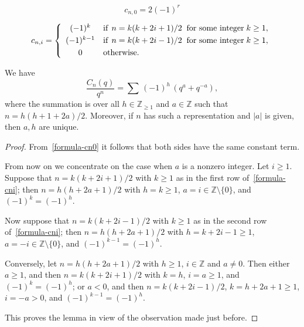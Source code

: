 \documentclass[10pt,a4paper]{amsart}
\newcommand\ZZ{\mathbb{Z}}
\begin{document}
\begin{equation}\label{formula-cn0}
c_{n,0} = 2 (-1)^r
\end{equation}

\begin{equation}\label{formula-cni}
c_{n,i} =
\left\{
\begin{array}{cl}
(-1)^k & \text{if}\;\, n = k(k+2i +1)/2 \;\; \text{for some integer}\; k  \geq 1, \\
\noalign{\smallskip}
(-1)^{k-1} & \text{if}\;\, n = k(k+2i -1)/2 \;\; \text{for some integer}\; k \geq 1, \\
\noalign{\smallskip}
0 & \text{otherwise.} 
\end{array}
\right.
\end{equation}

\begin{lemma}\label{formula1} 
We have
\[
\frac{C_n(q)}{q^n} = \sum\,  (-1)^h \, \left( q^a + q^{-a} \right), 
\]
where the summation is over all $h\in\ZZ_{\geq 1}$ and $a\in \ZZ$ such that $n=h(h+1+2a)/2$. 
Moreover, if $n$ has such a representation and $|a|$ is given, then $a,h$ are unique.
\end{lemma}

\begin{proof}
From~\eqref{formula-cn0} it follows that both sides have the same constant term. 

From now on we concentrate on the case when $a$ is a nonzero integer.
Let $i\geq 1$.
Suppose that $n=k(k+2i +1)/2$ with $k\geq 1$ as in the first row of~\eqref{formula-cni}; 
then $n=h(h+2a +1)/2$ with $h=k \geq 1$, $a=i\in \ZZ \setminus \{0\}$, and $(-1)^k=(-1)^h$. 

Now suppose that $n = k(k+2i -1)/2$ with $k\geq 1$ as in the second row of~\eqref{formula-cni}; 
then $n=h(h+2a +1)/2$ with $h=k+2i-1\geq 1$, $a=-i\in \ZZ \setminus \{0\}$, and $(-1)^{k-1}=(-1)^h$. 

Conversely, let $n=h(h+2a +1)/2$ with $h\geq 1$, $i\in \ZZ$ and $a\neq 0$. 
Then either $a\geq 1$, and then $n=k(k+2i +1)/2$ with $k=h$, $i=a\geq 1$, and $(-1)^k=(-1)^h$; 
or $a < 0$, and then $n=k(k+2i-1)/2$, $k=h+2a+1\geq 1$, $i = -a > 0$, and $(-1)^{k-1}=(-1)^h$.

This proves the lemma in view of the observation made just before.
\end{proof}
\end{document}
